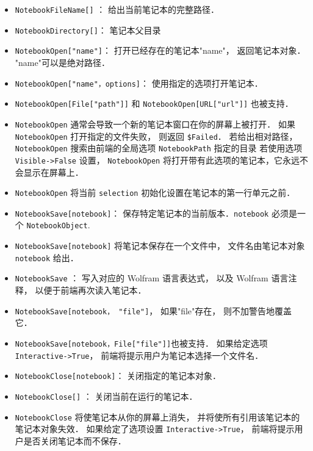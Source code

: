 \begin{itemize}
\item \verb`NotebookFileName[]` ： 给出当前笔记本的完整路径．
\item \verb`NotebookDirectory[]`： 笔记本父目录
\end{itemize}


\begin{itemize}
\item \verb`NotebookOpen["name"]`：  打开已经存在的笔记本"name"， 返回笔记本对象． "name"可以是绝对路径．
\item \verb`NotebookOpen["name"，options]`： 使用指定的选项打开笔记本．
\item \verb`NotebookOpen[File["path"]]` 和 \verb`NotebookOpen[URL["url"]]` 也被支持．
\item \verb`NotebookOpen` 通常会导致一个新的笔记本窗口在你的屏幕上被打开．
如果 \verb`NotebookOpen` 打开指定的文件失败， 则返回 \verb`$Failed`．
若给出相对路径， \verb`NotebookOpen` 搜索由前端的全局选项 \verb`NotebookPath` 指定的目录
若使用选项 \verb`Visible->False` 设置， \verb`NotebookOpen` 将打开带有此选项的笔记本，它永远不会显示在屏幕上．
\item \verb`NotebookOpen` 将当前 \verb`selection` 初始化设置在笔记本的第一行单元之前．
\end{itemize}


\begin{itemize}
\item \verb`NotebookSave[notebook]`： 保存特定笔记本的当前版本．\verb`notebook` 必须是一个 \verb`NotebookObject`.
\item \verb`NotebookSave[notebook]` 将笔记本保存在一个文件中， 文件名由笔记本对象 \verb`notebook` 给出．
\item \verb`NotebookSave` ： 写入对应的 Wolfram 语言表达式， 以及 Wolfram 语言注释， 以便于前端再次读入笔记本．
\item \verb`NotebookSave[notebook， "file"]`， 如果"file"存在， 则不加警告地覆盖它．
\item \verb`NotebookSave[notebook，File["file"]]`也被支持．
如果给定选项 \verb`Interactive->True`， 前端将提示用户为笔记本选择一个文件名．
\item \verb`NotebookClose[notebook]`： 关闭指定的笔记本对象．
\item \verb`NotebookClose[]` ： 关闭当前在运行的笔记本．
\item \verb`NotebookClose` 将使笔记本从你的屏幕上消失， 并将使所有引用该笔记本的笔记本对象失效．
如果给定了选项设置 \verb`Interactive->True`， 前端将提示用户是否关闭笔记本而不保存．
\end{itemize}




